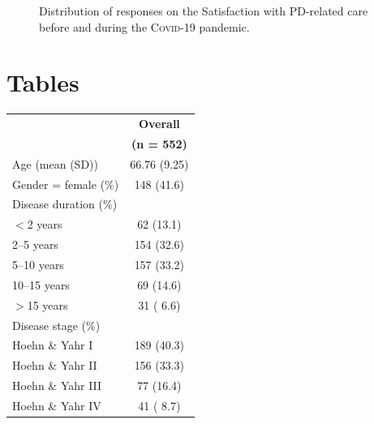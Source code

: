 \documentclass{bmcart}
\begin{document}
\begin{backmatter}
\begin{figure}[h!]
\caption{Distribution of responses on the Satisfaction with PD-related care before and during the \textsc{Covid}-19 pandemic.}
\end{figure}
		
		
\section*{Tables}
\begin{table}[!ht]
\begin{tabular}{p{5cm} c}
\toprule
																		&	\textbf{Overall}	\\ %
																		& 	\textbf{(n = 552)}\\ 
\midrule
Age (mean (SD)) 															& 	66.76 (9.25) 	\\ \hline
Gender = female (\%) 														&  	148 (41.6)  		\\ \hline
Disease duration (\%) 														& 				\\ \hline
\hspace{3mm} $<$2 years 													& 	62 (13.1) 		\\ \hline
\hspace{3mm} 2--5 years 													& 	154 (32.6) 		\\ \hline
\hspace{3mm} 5--10 years 													& 	157 (33.2) 		\\ \hline
\hspace{3mm} 10--15 years 													& 	69 (14.6) 		\\ \hline
\hspace{3mm} $>$15 years													& 	31 ( 6.6) 		\\ \hline
Disease stage (\%)															& 				\\ \hline
\hspace{3mm} Hoehn \& Yahr I 												&  	189 (40.3) 		\\ \hline
\hspace{3mm} Hoehn \& Yahr II 												& 	156 (33.3)  		\\ \hline
\hspace{3mm} Hoehn \& Yahr III  												&   	77 (16.4) 		\\ \hline
\hspace{3mm} Hoehn \& Yahr IV  												& 	41 ( 8.7) 		\\ \hline

\end{tabular}
\end{table}
\end{backmatter}
\end{document}
